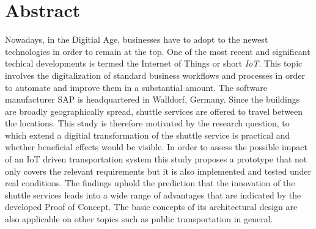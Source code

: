 \chapter*{Abstract} 


Nowadays, in the Digitial Age, businesses have to adopt to the newest
technologies in order to remain at the top. One of the most recent and
significant techical developments  is termed the Internet of Things or short
\emph{IoT}.
This topic involves the digitalization of standard business workflows and
processes in order to automate and improve them in a substantial amount.
\newline The software manufacturer SAP is headquartered in Walldorf, Germany.
Since the buildings are broadly geographically spread, shuttle services are
offered to travel between the locations. \newline This study is therefore
motivated by the research question, to which extend a digitial transformation of
the shuttle service is practical and whether beneficial effects would be
visible.
In order to assess the possible impact of an IoT driven transportation system
this study proposes a prototype that not only covers the relevant requirements
but it is also implemented and tested under real conditions. \newline The
findings uphold the prediction that the innovation of the shuttle services leads
into a wide range of advantages that are indicated by the developed Proof of
Concept. The basic concepts of its architectural design are also
applicable on other topics such as public transportation in general. 
